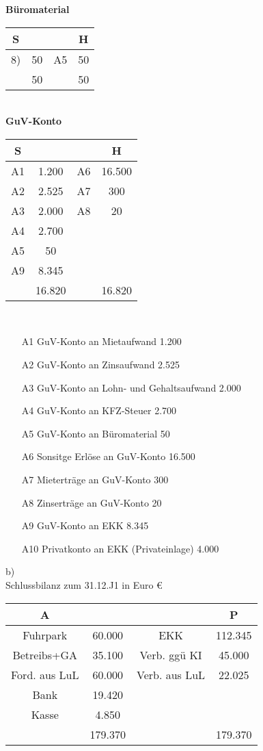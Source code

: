 \documentclass[paper=a4, fontsize=11pt]{scrartcl}
\numberwithin{equation}{section}
\numberwithin{figure}{section}
\numberwithin{table}{section}
\begin{document}
\textbf{Büromaterial}
\begin{tabular}{cc|cc}
S & & & H \\\hline
8) & 50 & A5 & 50 \\\hline
  & 50 & & 50 \\\hline
\end{tabular} \\
\textbf{GuV-Konto}
\begin{tabular}{cc|cc}
S & & & H \\\hline
A1 & 1.200 & A6 & 16.500 \\
A2 & 2.525 & A7 & 300 \\
A3 & 2.000 & A8 & 20 \\
A4 & 2.700 & & \\
A5 & 50 & & \\
A9 & 8.345 & & \\\hline
  & 16.820 & & 16.820 \\\hline
\end{tabular} \\

\begin{itemize}
\item[A1] GuV-Konto an Mietaufwand 1.200
\item[A2] GuV-Konto an Zinsaufwand 2.525
\item[A3] GuV-Konto an Lohn- und Gehaltsaufwand 2.000
\item[A4] GuV-Konto an KFZ-Steuer 2.700
\item[A5] GuV-Konto an Büromaterial 50
\item[A6] Sonsitge Erlöse an GuV-Konto 16.500
\item[A7] Mieterträge an GuV-Konto 300
\item[A8] Zinserträge an GuV-Konto 20
\item[A9] GuV-Konto an EKK 8.345
\item[A10] Privatkonto an EKK (Privateinlage) 4.000
\end{itemize}

b) \\
Schlussbilanz zum 31.12.J1 in Euro $€$ \\
\begin{tabular}{cc|cc}
A & & & P \\\hline
Fuhrpark & 60.000 & EKK & 112.345 \\
Betreibs+GA  & 35.100 & Verb. ggü KI & 45.000 \\
Ford. aus LuL  & 60.000 & Verb. aus LuL & 22.025 \\
Bank & 19.420 & & \\
Kasse & 4.850 & & \\\hline
  & 179.370 & & 179.370 \\\hline
\end{tabular}
\end{document}
